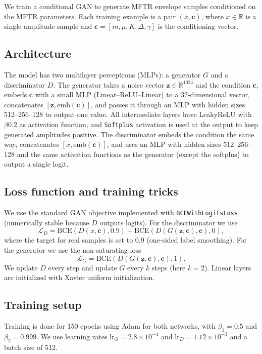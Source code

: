 We train a conditional GAN to generate MFTR envelope samples conditioned on the MFTR parameters. Each training example is a pair $(x,\mathbf{c})$, where $x\in\mathbb{R}$ is a single amplitude sample and $\mathbf{c}=[m,\mu,K,\Delta,\bar{\gamma}]$ is the conditioning vector.

\subsection{Architecture}
The model has two multilayer perceptrons (MLPs): a generator $G$ and a discriminator $D$.
The generator takes a noise vector $\mathbf{z}\in\mathbb{R}^{1024}$ and the condition $\mathbf{c}$, embeds $\mathbf{c}$ with a small MLP (Linear--ReLU--Linear) to a 32-dimensional vector, concatenates $[\mathbf{z},\mathrm{emb}(\mathbf{c})]$, and passes it through an MLP with hidden sizes 512--256--128 to output one value. All intermediate layers have LeakyReLU with $\beta 0.2$ as activation function, and \texttt{Softplus} activation is used at the output to keep generated amplitudes positive.
The discriminator embeds the condition the same way, concatenates $[x,\mathrm{emb}(\mathbf{c})]$, and uses an MLP with hidden sizes 512--256--128 and the same activation functions as the generator (except the softplus) to output a single logit.

\subsection{Loss function and training tricks}
We use the standard GAN objective implemented with \texttt{BCEWithLogitsLoss} (numerically stable because $D$ outputs logits).
For the discriminator we use
\begin{equation}
    \mathcal{L}_D = \mathrm{BCE}(D(x,\mathbf{c}), 0.9) + \mathrm{BCE}(D(G(\mathbf{z},\mathbf{c}),\mathbf{c}), 0),
\end{equation}
where the target for real samples is set to 0.9 (one-sided label smoothing).
For the generator we use the non-saturating loss
\begin{equation}
    \mathcal{L}_G = \mathrm{BCE}(D(G(\mathbf{z},\mathbf{c}),\mathbf{c}), 1).
\end{equation}
We update $D$ every step and update $G$ every $k$ steps (here $k=2$). Linear layers are initialized with Xavier uniform initialization.

\subsection{Training setup}
Training is done for 150 epochs using Adam for both networks, with $\beta_1=0.5$ and $\beta_2=0.999$.
We use learning rates $\mathrm{lr}_G=2.8\times 10^{-4}$ and $\mathrm{lr}_D=1.12\times 10^{-3}$ and a batch size of 512.

